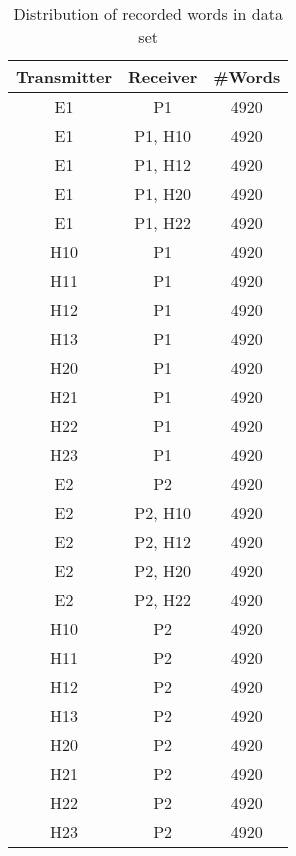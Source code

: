 \documentclass[conference]{IEEEtran}
\begin{document}
  \begin{table}
    \caption{Distribution of recorded words in data set}
    \label{tab:RecordingsSummery}
    \centering
    \begin{tabular}{|c c c|} 
      \hline
      Transmitter & Receiver & \#Words \\ [0.5ex] 
      \hline\hline
      E1 & P1 & 4920 \\ %
      \hline
      E1 & P1, H10 & 4920 \\
      \hline
      E1 & P1, H12 & 4920 \\
      \hline
      E1 & P1, H20 & 4920 \\
      \hline
      E1 & P1, H22 & 4920 \\
      \hline
      H10 & P1 & 4920 \\
      \hline
      H11 & P1 & 4920 \\
      \hline
      H12 & P1 & 4920 \\
      \hline
      H13 & P1 & 4920 \\
      \hline
      H20 & P1 & 4920 \\
      \hline
      H21 & P1 & 4920 \\
      \hline
      H22 & P1 & 4920 \\
      \hline
      H23 & P1 & 4920 \\
      \hline
      E2 & P2 & 4920 \\ %
      \hline
      E2 & P2, H10 & 4920 \\
      \hline
      E2 & P2, H12 & 4920 \\
      \hline
      E2 & P2, H20 & 4920 \\
      \hline
      E2 & P2, H22 & 4920 \\
      \hline
      H10 & P2 & 4920 \\
      \hline
      H11 & P2 & 4920 \\
      \hline
      H12 & P2 & 4920 \\
      \hline
      H13 & P2 & 4920 \\
      \hline
      H20 & P2 & 4920 \\
      \hline
      H21 & P2 & 4920 \\
      \hline
      H22 & P2 & 4920 \\
      \hline
      H23 & P2 & 4920 \\
      \hline
    \end{tabular}
  \end{table}
  
\end{document}
